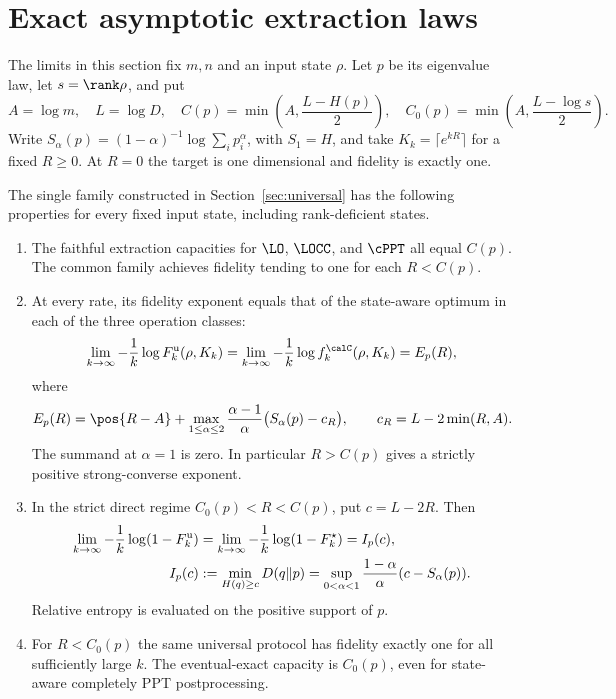 \section{Exact asymptotic extraction laws}\label{sec:asymptotic}

The limits in this section fix $m,n$ and an input state $\rho$. Let $p$ be its eigenvalue law, let $s=\rank\rho$, and put
\[
 A=\log m,\quad L=\log D,\quad
 C(p)=\min\left(A,\frac{L-H(p)}2\right),\quad
 C_0(p)=\min\left(A,\frac{L-\log s}2\right).
\]
Write $S_\alpha(p)=(1-\alpha)^{-1}\log\sum_i p_i^\alpha$, with $S_1=H$, and take $K_k=\lceil e^{kR}\rceil$ for a fixed $R\ge0$. At $R=0$ the target is one dimensional and fidelity is exactly one.

\begin{theorem}\label{thm:universal-laws}
The single family constructed in Section~\ref{sec:universal} has the following properties for every fixed input state, including rank-deficient states.
\begin{enumerate}
\item The faithful extraction capacities for $\LO$, $\LOCC$, and $\cPPT$ all equal $C(p)$. The common family achieves fidelity tending to one for each $R<C(p)$.
\item At every rate, its fidelity exponent equals that of the state-aware optimum in each of the three operation classes:
\begin{equation}\label{eq:exact-exponent}
 \lim_{k\to\infty}-\frac1k\log F_k^{\rm u}(\rho,K_k)
 =\lim_{k\to\infty}-\frac1k\log f_k^{\calC}(\rho,K_k)
 =E_p(R),
\end{equation}
where
\begin{equation}\label{eq:exponent-formula}
 E_p(R)=\pos{R-A}+\max_{1\le\alpha\le2}
 \frac{\alpha-1}{\alpha}\bigl(S_\alpha(p)-c_R\bigr),
 \qquad c_R=L-2\min(R,A).
\end{equation}
The summand at $\alpha=1$ is zero. In particular $R>C(p)$ gives a strictly positive strong-converse exponent.
\item In the strict direct regime $C_0(p)<R<C(p)$, put $c=L-2R$. Then
\begin{equation}\label{eq:reliability}
 \begin{aligned}
 \lim_{k\to\infty}-\frac1k\log(1-F_k^{\rm u})
 &=\lim_{k\to\infty}-\frac1k\log(1-F_k^\star)=I_p(c),\\
 I_p(c)&:=\min_{H(q)\ge c}D(q\|p)
 =\sup_{0<\alpha<1}\frac{1-\alpha}{\alpha}(c-S_\alpha(p)).
 \end{aligned}
\end{equation}
Relative entropy is evaluated on the positive support of $p$.
\item For $R<C_0(p)$ the same universal protocol has fidelity exactly one for all sufficiently large $k$. The eventual-exact capacity is $C_0(p)$, even for state-aware completely PPT postprocessing.
\end{enumerate}
\end{theorem}

